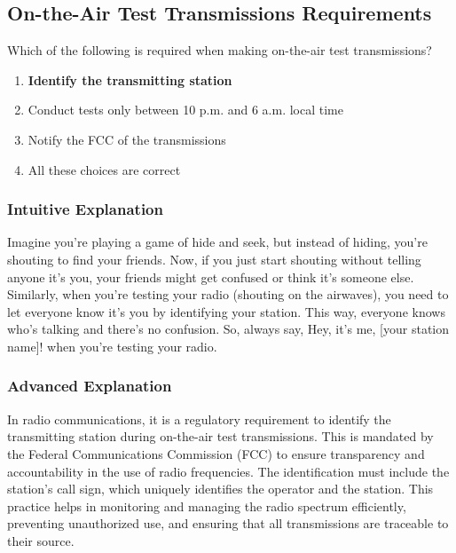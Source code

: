 \subsection{On-the-Air Test Transmissions Requirements}
\label{T2A06}

\begin{tcolorbox}[colback=gray!10!white,colframe=black!75!black,title=T2A06]
Which of the following is required when making on-the-air test transmissions?
\begin{enumerate}[label=\Alph*)]
    \item \textbf{Identify the transmitting station}
    \item Conduct tests only between 10 p.m. and 6 a.m. local time
    \item Notify the FCC of the transmissions
    \item All these choices are correct
\end{enumerate}
\end{tcolorbox}

\subsubsection{Intuitive Explanation}
Imagine you're playing a game of hide and seek, but instead of hiding, you're shouting to find your friends. Now, if you just start shouting without telling anyone it's you, your friends might get confused or think it's someone else. Similarly, when you're testing your radio (shouting on the airwaves), you need to let everyone know it's you by identifying your station. This way, everyone knows who's talking and there's no confusion. So, always say, Hey, it's me, [your station name]! when you're testing your radio.

\subsubsection{Advanced Explanation}
In radio communications, it is a regulatory requirement to identify the transmitting station during on-the-air test transmissions. This is mandated by the Federal Communications Commission (FCC) to ensure transparency and accountability in the use of radio frequencies. The identification must include the station's call sign, which uniquely identifies the operator and the station. This practice helps in monitoring and managing the radio spectrum efficiently, preventing unauthorized use, and ensuring that all transmissions are traceable to their source.

